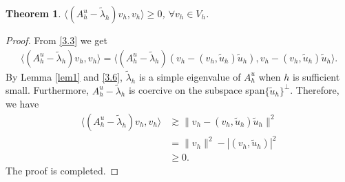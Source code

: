 \documentclass[compress, preprint,9pt]{elsarticle}
\numberwithin{equation}{section}
\newtheorem{theo}{Theorem}[section]
\newtheorem{coro}{Corollary}[section]
\newcommand{\la}{\langle}
\newcommand{\ran}{\rangle}
\begin{document}


\begin{theo}\label{theo2}
	$\la (A_h^u-\widetilde{\lambda}_h)v_h,v_h\ran\ge 0$, $\forall v_h\in V_h$.
\end{theo}
\begin{proof}
	From \eqref{3.3} we get
	\begin{eqnarray*}
		\la (A_h^u-\widetilde{\lambda}_h)v_h,v_h\ran=\la(A_h^u-\widetilde{\lambda}_h)\left(v_h-(v_h,\widetilde{u}_h)\widetilde{u}_h\right),v_h-(v_h,\widetilde{u}_h)\widetilde{u}_h\ran.
	\end{eqnarray*}
	By Lemma \ref{lem1} and \eqref{3.6}, $\widetilde{\lambda}_h$ is a simple eigenvalue of $A_h^u$ when $h$ is sufficient small. Furthermore, $A_h^u-\widetilde{\lambda}_h$ is coercive on the subspace  span$\{\widetilde{u}_h\}^\perp$. Therefore, we have
	\begin{equation}\label{3.7}
		\begin{aligned}
			\la (A_h^u-\widetilde{\lambda}_h)v_h,v_h\ran&\gtrsim \|v_h-(v_h,\widetilde{u}_h)\widetilde{u}_h\|^2\\
			&=\|v_h\|^2-|(v_h,\widetilde{u}_h)|^2\\
			&\ge0.
		\end{aligned}
	\end{equation}
	The proof is completed.
\end{proof}
\end{document}
